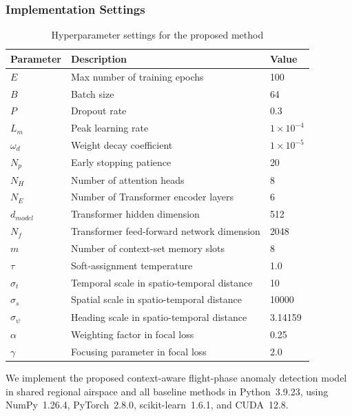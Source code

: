 \documentclass[iicol,pdflatex,sn-basic,Numbered]{sn-jnl}%
\theoremstyle{thmstyleone}%
\theoremstyle{thmstyletwo}%
\theoremstyle{thmstylethree}%
\begin{document}
\subsubsection{Implementation Settings}

\begin{table}[t]
  \centering
  \setlength{\tabcolsep}{2pt}
  \renewcommand{\arraystretch}{1.05}
  \caption{Hyperparameter settings for the proposed method}
  \label{tab:hyperparameters}
  \tablebodyfont
  \begin{tabularx}{\columnwidth}{@{}l>{\raggedright\arraybackslash}Xl@{}}
    \toprule
    Parameter & Description & Value \\
    \midrule
    $E$ & Max number of training epochs & 100 \\
    $B$ & Batch size & 64 \\
    $P$ & Dropout rate & 0.3 \\
    $L_m$ & Peak learning rate & $1 \times 10^{-4}$ \\
    $\omega_d$ & Weight decay coefficient & $1 \times 10^{-5}$ \\
    $N_p$ & Early stopping patience & 20 \\
    $N_H$ & Number of attention heads & 8 \\
    $N_E$ & Number of Transformer encoder layers & 6 \\
    $d_{model}$ & Transformer hidden dimension & 512 \\
    $N_f$ & Transformer feed-forward network dimension & 2048 \\
    $m$ & Number of context-set memory slots & 8 \\
    $\tau$ & Soft-assignment temperature & 1.0 \\
    $\sigma_t$ & Temporal scale in spatio-temporal distance & 10 \\
    $\sigma_s$ & Spatial scale in spatio-temporal distance & 10000 \\
    $\sigma_{\psi}$ & Heading scale in spatio-temporal distance & 3.14159 \\
    $\alpha$ & Weighting factor in focal loss & 0.25 \\
    $\gamma$ & Focusing parameter in focal loss & 2.0 \\
    \bottomrule
  \end{tabularx}
\end{table}
We implement the proposed context-aware flight-phase anomaly detection model in shared regional airspace and all baseline methods in Python~3.9.23, using NumPy~1.26.4, PyTorch~2.8.0, scikit-learn~1.6.1, and CUDA~12.8.
\end{document}
